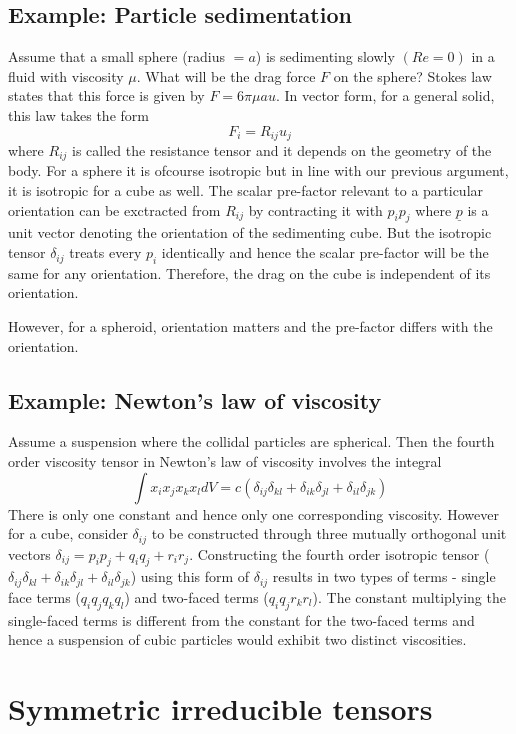 \documentclass[11pt, letterpaper]{article}
\newcommand{\dl}{\delta}
\newcommand{\dij}{\delta_{ij}}
\newcommand{\1}{\bm{1}}
\newcommand{\un}[1]{\underline{#1}}
\begin{document}
\subsection{Example: Particle sedimentation}
Assume that a small sphere (radius $= a$) is sedimenting slowly $(Re=0)$ in a fluid with viscosity $\mu$. What will be the drag force $F$ on the sphere? Stokes law states that this force is given by $F=6\pi \mu a u$. In vector form, for a general solid, this law takes the form 
$$
F_i = R_{ij} u_j
$$
where $R_{ij}$ is called the resistance tensor and it depends on the geometry of the body. For a sphere it is ofcourse isotropic but in line with our previous argument, it is isotropic for a cube as well. The scalar pre-factor relevant to a particular orientation can be exctracted from $R_{ij}$ by contracting it with $p_ip_j$ where $\un{p}$ is a unit vector denoting the orientation of the sedimenting cube. But the  isotropic tensor $\dij$ treats every $p_i$ identically and hence the scalar pre-factor will be the same for any orientation. Therefore, the drag on the cube is independent of its orientation.

However, for a spheroid, orientation matters and the pre-factor differs with the orientation.

\subsection{Example: Newton's law of viscosity}
Assume a suspension where the collidal particles are spherical. Then the fourth order viscosity tensor in Newton's law of viscosity involves the integral
$$
\int x_ix_jx_kx_l dV = c(\dl_{ij}\dl_{kl}+\dl_{ik}\dl_{jl}+\dl_{il}\dl_{jk})
$$
There is only one constant and hence only one corresponding viscosity. However for a cube, consider $\dij$ to be constructed through three mutually orthogonal unit vectors $\dij = p_ip_j + q_iq_j + r_ir_j$. Constructing the fourth order isotropic tensor ($\dl_{ij}\dl_{kl}+\dl_{ik}\dl_{jl}+\dl_{il}\dl_{jk}$) using this form of $\dij$ results in two types of terms - single face terms ($q_iq_jq_kq_l$) and two-faced terms ($q_iq_jr_kr_l$). The constant multiplying the single-faced terms is different from the constant for the two-faced terms and hence a suspension of cubic particles would exhibit two distinct viscosities.


\section{Symmetric irreducible tensors}
\end{document}
